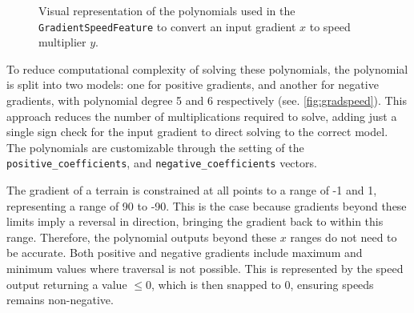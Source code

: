 \documentclass[12pt]{article}
\begin{document}
\begin{figure}[H]
  \centering
  \caption{Visual representation of the polynomials used in the \texttt{GradientSpeedFeature} to convert an input gradient $x$ to speed multiplier $y$.}
  \label{fig:gradspeed}
\end{figure}

To reduce computational complexity of solving these polynomials, the polynomial is split into two models: one for positive gradients, and another for negative gradients, with polynomial degree 5 and 6 respectively (see. \autoref{fig:gradspeed}). This approach reduces the number of multiplications required to solve, adding just a single sign check for the input gradient to direct solving to the correct model. The polynomials are customizable through the setting of the \texttt{positive\_coefficients}, and \texttt{negative\_coefficients} vectors.

The gradient of a terrain is constrained at all points to a range of -1 and 1, representing a range of 90 to -90. This is the case because gradients beyond these limits imply a reversal in direction, bringing the gradient back to within this range. Therefore, the polynomial outputs beyond these $x$ ranges do not need to be accurate. Both positive and negative gradients include maximum and minimum values where traversal is not possible. This is represented by the speed output returning a value $\leq{0}$, which is then snapped to 0, ensuring speeds remains non-negative.
\end{document}
